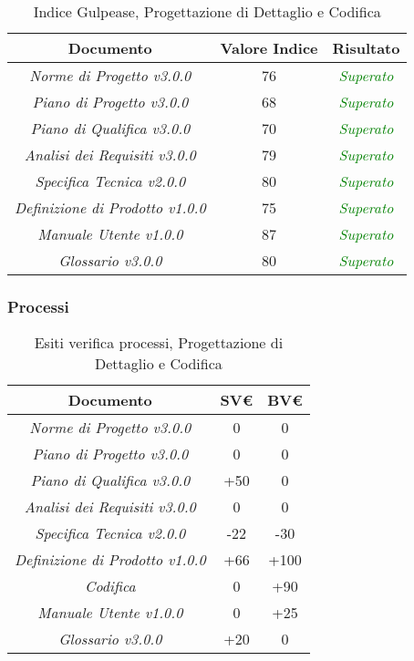 \hspace{1cm}

\begin{table}[h]
	\begin{tabular}{|c|c|c|}
		\hline 
		\textbf{Documento} & \textbf{Valore Indice} & \textbf{Risultato} \\ 
		\hline
		\textit{Norme di Progetto v3.0.0} & 76 & \textcolor{green}{\textit{Superato}} \\  
		\textit{Piano di Progetto v3.0.0} & 68 & \textcolor{green}{\textit{Superato}} \\ 
		\textit{Piano di Qualifica v3.0.0} & 70 & \textcolor{green}{\textit{Superato}} \\ 
		\textit{Analisi dei Requisiti v3.0.0} & 79 & \textcolor{green}{\textit{Superato}} \\
		\textit{Specifica Tecnica v2.0.0} & 80 & \textcolor{green}{\textit{Superato}} \\ 
		\textit{Definizione di Prodotto v1.0.0} & 75 & \textcolor{green}{\textit{Superato}} \\ 
		\textit{Manuale Utente v1.0.0} & 87 & \textcolor{green}{\textit{Superato}} \\ 
		\textit{Glossario v3.0.0} & 80 & \textcolor{green}{\textit{Superato}} \\ 
		\hline 
\end{tabular}
\caption{Indice Gulpease, Progettazione di Dettaglio e Codifica}
\end{table}

\subsubsection{Processi}
\label{appendice 6}
\vspace{3mm}

\begin{table}[h]
	\begin{tabular}{|c|c|c|}
		\toprule
			\textbf{Documento} & \textbf{SV\euro} & \textbf{BV\euro} \\ 
		\midrule
		\midrule
			\textit{Norme di Progetto v3.0.0} & 0 & 0 \\  
			\textit{Piano di Progetto v3.0.0} & 0 & 0 \\ 
			\textit{Piano di Qualifica v3.0.0} & +50 & 0 \\ 
			\textit{Analisi dei Requisiti v3.0.0} & 0 & 0 \\
			\textit{Specifica Tecnica v2.0.0} & -22 & -30\\ 
			\textit{Definizione di Prodotto v1.0.0} & +66 & +100\\
			\textit{Codifica} & 0 & +90 \\
			\textit{Manuale Utente v1.0.0} & 0 & +25\\
			\textit{Glossario v3.0.0} & +20 & 0 \\ 
		\bottomrule
	\end{tabular}
\caption{Esiti verifica processi, Progettazione di Dettaglio e Codifica}
\end{table}

